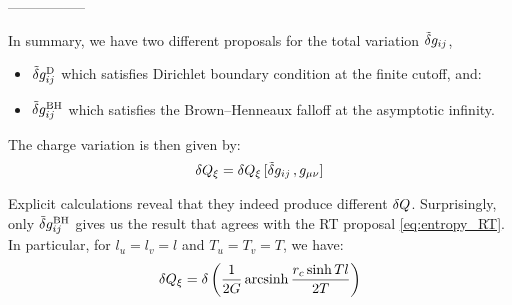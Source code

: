 \documentclass[12pt,a4paper,utf8]{article}
\newcommand{\tvar}[1]{\mathinner{\tilde{\delta} #1}}
\begin{document}
	
	\hfil -----------------
	
	In summary, we have two different proposals for the total variation $\tvar{g_{ij}}$,
	\begin{itemize}[nosep]
	\item $\tvar{g^\mrm{D}_{ij}}$ which satisfies Dirichlet boundary condition at the finite cutoff, and:
	\item $\tvar{g^\mrm{BH}_{ij}}$ which satisfies the Brown--Henneaux falloff at the asymptotic infinity.
	\end{itemize}
	The charge variation is then given by:
	\begin{equation}
		\var{Q_\xi}
		= \var{Q_\xi}[\tvar{g_{ij}},g_{\mu\nu}]
	\end{equation}
	
	Explicit calculations reveal that they indeed produce different $\mathinner{\delta Q}$. 
	Surprisingly, only $\tvar{g^\mrm{BH}_{ij}}$ gives us the result that agrees with the RT proposal \eqref{eq:entropy_RT}. 
	In particular, for $l_u = l_v = l$ and $T_u = T_v = T$, we have:
	\begin{equation}
		\mathinner{\delta Q_\xi}
		= \delta\left(
				\frac{1}{2G} \operatorname{arcsinh}
				\frac{r_c \sinh Tl}{2T}
			\right)
	\end{equation}
	
\end{document}
